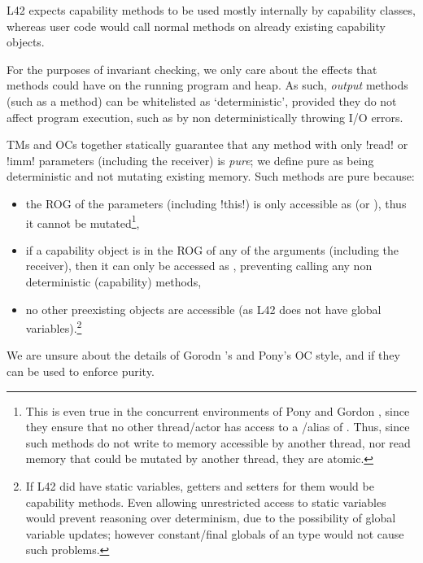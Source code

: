 \noindent L42 expects capability methods to be used mostly internally by capability classes, whereas user code would call normal methods on already existing capability objects.

For the purposes of invariant checking, we only care about the effects that methods could have on the running program and heap. As such, \emph{output} methods (such as a \Q@print@ method) can be whitelisted as `deterministic', provided they do not affect program execution, such as by non deterministically throwing I/O errors.

\label{s:purity}
TMs and OCs together statically guarantee that any method with only \Q!read! or \Q!imm! parameters (including the receiver) is \emph{pure}; we define pure
as being deterministic and not mutating existing memory. Such methods are pure because:
\SSI\begin{itemize}
	\item the ROG of the parameters (including \Q!this!) is only accessible as \Q@read@ (or \Q@imm@), thus it cannot be mutated\footnote{This is even true in the concurrent environments of Pony and Gordon \etal, since they ensure that no other thread/actor has access to a \Q@mut@/\Q@capsule@ alias of \Q@this@. 
	Thus, since such methods do not write to memory accessible by another thread, nor read memory that could be mutated by another thread, they are atomic.},
	\item if a capability object is in the ROG of any of the arguments (including the receiver), then it can only be accessed as \Q@read@, preventing calling any non deterministic (capability) methods,
	\item no other preexisting objects are accessible (as L42 does not have global variables).\footnote{%
		If L42 did have static variables, getters and setters for them would be capability methods.
		Even allowing unrestricted access to \Q@imm@
		static variables would prevent reasoning over
		determinism, due to the possibility of global variable
		updates; however constant/final globals of an 
		\Q@imm@ type would not cause such problems.%
	}
\end{itemize}
We are unsure about the details of Gorodn \etal's and Pony's OC style, and if they can be used to enforce purity.



